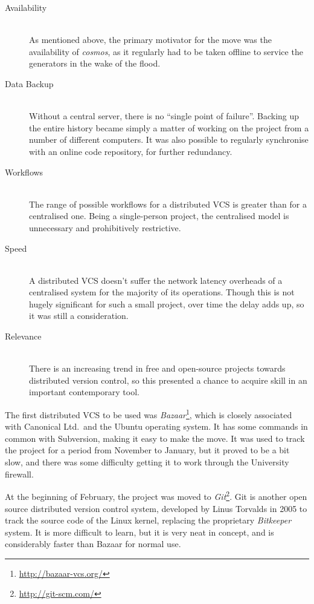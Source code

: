 \begin{description}
\item[Availability] \hfill \\
As mentioned above, the primary motivator for the move was the availability of
\emph{cosmos}, as it regularly had to be taken offline to service the generators
in the wake of the flood. 
\item[Data Backup] \hfill \\
Without a central server, there is no ``single point of failure''. Backing
up the entire history became simply a matter of working on the project from a
number of different computers. It was also possible to regularly synchronise
with an online code repository, for further redundancy.
\item[Workflows] \hfill \\
The range of possible workflows for a distributed VCS is greater than for a
centralised one. Being a single-person project, the centralised model is
unnecessary and prohibitively restrictive.
\item[Speed] \hfill \\
A distributed VCS doesn't suffer the network latency overheads of a centralised
system for the majority of its operations. Though this is not hugely significant
for such a small project, over time the delay adds up, so it was still a
consideration.
\item[Relevance] \hfill \\
There is an increasing trend in free and open-source projects towards
distributed version control, so this presented a chance to acquire skill in an
important contemporary tool.
\end{description}

The first distributed VCS to be used was
\emph{Bazaar}\footnote{\url{http://bazaar-vcs.org/}}, which is closely
associated with Canonical Ltd.\ and the Ubuntu operating system. It has some
commands in common with Subversion, making it easy to make the move. It was used
to track the project for a period from November to January, but it proved to be
a bit slow, and there was some difficulty getting it to work through the
University firewall.

At the beginning of February, the project was moved to
\emph{Git}\footnote{\url{http://git-scm.com/}}. Git is another open source
distributed version control system, developed by Linus Torvalds in 2005 to track
the source code of the Linux kernel, replacing the proprietary \emph{Bitkeeper}
system. It is more difficult to learn, but it is very neat in concept, and is
considerably faster than Bazaar for normal use.


